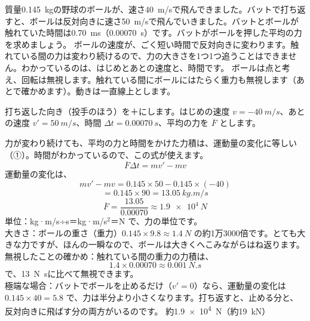 \label{ph:力-3:ex1}
\begin{phreidai}[バットでボールを打ち返す]
質量\qty{0.145}{kg}の野球のボールが、速さ\qty{40}{m/s}で飛んできました。バットで打ち返すと、ボールは反対向きに速さ\qty{50}{m/s}で飛んでいきました。バットとボールが触れていた時間は\qty{0.70}{ms}（\qty{0.00070}{s}）です。バットがボールを押した平均の力を求めましょう。
\phbamen
ボールの速度が、ごく短い時間で反対向きに変わります。触れている間の力は変わり続けるので、力の大きさを1つ1つ追うことはできません。わかっているのは、はじめとあとの速度と、時間です。
\phmushi
ボールは点と考え、回転は無視します。触れている間にボールにはたらく重力も無視します（あとで確かめます）。動きは一直線上とします。
\phzu
\noindent\begin{minipage}[c]{0.5\linewidth}\centering
{}
\end{minipage}\hfill
\begin{minipage}[c]{0.47\linewidth}\raggedright
打ち返した向き（投手のほう）を＋にします。はじめの速度 $v=\qty{-40}{m/s}$、あとの速度 $v'=\qty{+50}{m/s}$、時間 $\Delta t=\qty{0.00070}{s}$、平均の力を $\overline{F}$ とします。
\end{minipage}
\phriyu
力が変わり続けても、平均の力と時間をかけた力積は、運動量の変化に等しい（①）。時間がわかっているので、この式が使えます。
\phtateru
\[\overline{F}\Delta t=mv'-mv\]
\phtoku
運動量の変化は、
\[mv'-mv=0.145\times50-0.145\times(-40)\]
\[=0.145\times90=\qty{13.05}{kg.m/s}\]
\[\overline{F}=\frac{13.05}{0.00070}\approx\qty{1.9e4}{N}\]
\phtashikame
単位：kg·m/s÷s＝kg·m/s$^2$＝N で、力の単位です。\\
大きさ：ボールの重さ（重力）$0.145\times9.8\approx\qty{1.4}{N}$ の約1万3000倍です。とても大きな力ですが、ほんの一瞬なので、ボールは大きくへこみながらはね返ります。\\
無視したことの確かめ：触れている間の重力の力積は、
\[1.4\times0.00070\approx\qty{0.001}{N.s}\]
で、\qty{13}{N.s}に比べて無視できます。\\
極端な場合：バットでボールを止めるだけ（$v'=0$）なら、運動量の変化は $0.145\times40=5.8$ で、力は半分より小さくなります。打ち返すと、止める分と、反対向きに飛ばす分の両方がいるのです。
\kotae 約\qty{1.9e4}{N}（約\qty{19}{kN}）
\end{phreidai}
